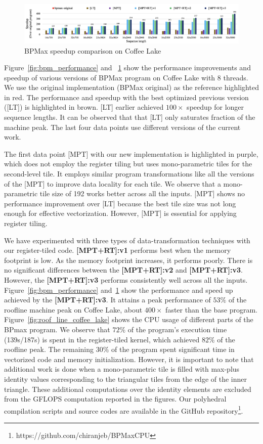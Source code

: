\begin{figure}[htbp]
\centerline{\includegraphics[width=\textwidth,scale=1.00, trim=5 5 5 5,clip]{content/figures/bpm_speed_up_new_tile.png}} 
\caption{BPMax speedup comparison on Coffee Lake}
\label{fig:bpm_speed_up}
\end{figure}
Figure~\ref{fig:bpm_performance} and ~\ref{fig:bpm_speed_up} show the performance improvements and speedup of various versions of BPMax program on Coffee Lake with $8$ threads. We use the original implementation (BPMax original) as the reference highlighted in red. 
The performance and speedup with the best optimized previous version \cite{Mondal2021} ([LT]) is highlighted in brown. [LT] earlier achieved  $100\times$ speedup for longer sequence lengths. It can be observed that that [LT] only saturates fraction of the machine peak. The last four data points use different versions of the current work. 

The first data point [MPT] with our new implementation is highlighted in purple, which does not employ the register tiling but uses mono-parametric tiles for the second-level tile. It employs similar program transformations like all the versions of the [MPT] to improve data locality for each tile. We observe that a mono-parametric tile size of 192 works better across all the inputs. [MPT] shows no performance improvement over [LT] because the best tile size was not long enough for effective vectorization. However, [MPT] is essential for applying register tiling.

We have experimented with three types of data-transformation techniques with our register-tiled code. \textbf{[MPT+RT]:v1} performs best when the memory footprint is low. As the memory footprint increases, it performs poorly. There is no significant differences between the \textbf{[MPT+RT]:v2} and \textbf{[MPT+RT]:v3}. However, the \textbf{[MPT+RT]:v3} performs consistently well across all the inputs. Figure~\ref{fig:bpm_performance} and~\ref{fig:bpm_speed_up} show the performance and speed up achieved by the \textbf{[MPT+RT]:v3}. It attains a peak performance of $53\%$ of the roofline machine peak on Coffee Lake, about $400\times$ faster than the base program. Figure~\ref{fig:roof_line_coffee_lake} shows the CPU usage of different parts of the BPmax program. We observe that $72\%$ of the program's execution time (139s/187s) is spent in the register-tiled kernel, which achieved $82\%$ of the roofline peak. The remaining $30\%$ of the program spent significant time in vectorized code and memory initialization. However, it is important to note that additional work is done when a mono-parametric tile is filled with max-plus identity values corresponding to the triangular tiles from the edge of the inner triangle. These additional computations over the identity elements are excluded from the GFLOPS computation reported in the figures. Our polyhedral compilation scripts and source codes are available in the GitHub repository\footnote{https://github.com/chiranjeb/BPMaxCPU}.
